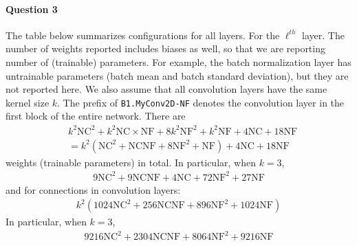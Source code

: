 \documentclass[12pt]{article}
\begin{document}
	\paragraph{Question 3} The table below summarizes configurations for all layers. For the $\ell^{th}$ layer.
	The number of weights reported includes biases as well, so that we are reporting number of (trainable) parameters. For example, the batch normalization layer has untrainable parameters (batch mean and batch standard deviation), but they are not reported here.
	We also assume that all convolution layers have the same kernel size $k$.
	The prefix of \texttt{B1.MyConv2D-NF} denotes the convolution layer in the first block of the entire network. 
	There are
	\begin{align}
		&k^2 \text{NC}^2+k^2 \text{NC}\times	 \text{NF}+8 k^2 \text{NF}^2+k^2 \text{NF}+4 \text{NC}+18 \text{NF} \\
		&= k^2 \left(\text{NC}^2+\text{NC} \text{NF}+8 \text{NF}^2+\text{NF}\right)+4 \text{NC}+18 \text{NF}
	\end{align}
	weights (trainable parameters) in total. In particular, when $k=3$,
	\begin{align}
		9 \text{NC}^2+9 \text{NC} \text{NF}+4 \text{NC}+72 \text{NF}^2+27 \text{NF}
	\end{align}
	and for connections in convolution layers:
	\begin{align}
		k^2 \left(1024 \text{NC}^2+256 \text{NC} \text{NF}+896 \text{NF}^2+1024 \text{NF}\right)
	\end{align}
	In particular, when $k=3$,
	\begin{align}
		9216 \text{NC}^2+2304 \text{NC} \text{NF}+8064 \text{NF}^2+9216 \text{NF}
	\end{align}
\end{document}
